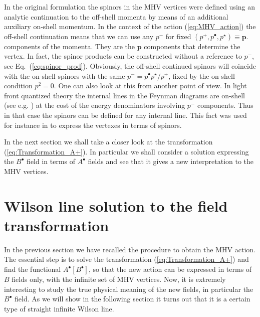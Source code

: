 \documentclass[english,american]{article}
\begin{document}
In the original formulation \citep{Cachazo2004} the spinors in the
MHV vertices were defined using an analytic continuation to the off-shell
momenta by means of  an additional auxiliary on-shell momentum. In the context
of the action (\ref{eq:MHV_action}) the off-shell continuation means
that we can use any $p^{-}$ for fixed  $\left(p^{+},p^{\bullet},p^{\star}\right)\equiv\mathbf{p}$.
components of the momenta. They are the $\mathbf{p}$ components that
determine the vertex. In fact, the spinor products can be constructed
without a reference to $p^{-}$, see Eq.~(\ref{eq:spinor_prod}). Obviously,
the off-shell continued spinors will coincide with the on-shell spinors
with the same $p^{-}=p^{\bullet}p^{\star}/p^{+}$,
fixed by the on-shell condition $p^{2}=0$. One can also look at this
from another point of view. In light front quantized theory the internal
lines in the Feynman diagrams are on-shell (see e.g. \citep{Cruz-Santiago2015a})
at the cost of the energy denominators involving $p^{-}$ components.
Thus in that case the spinors can be defined for any internal line.
This fact was used for instance in \citep{Motyka2009} to express
the vertexes in terms of spinors.

In the next section we shall take a closer look at the transformation
(\ref{eq:Transformation_A+}). In particular we shall consider a solution
expressing the $B^{\bullet}$ field in terms of $A^{\bullet}$ fields
and see that it gives a new interpretation to the MHV vertices.

\section{Wilson line solution to the field transformation}

\label{sec:WilsonLineSolution}

In the previous section we have recalled the procedure to obtain the
MHV action. The essential step is to solve the transformation (\ref{eq:Transformation_A+})
and find the functional $A^{\bullet}\left[B^{\bullet}\right]$, so
that the new action can be expressed in terms of $B$ fields only, with the infinite set of MHV vertices.
Now, it is extremely interesting to study the true physical meaning
of the new fields, in particular the $B^{\bullet}$ field. As we will
show in the following section it turns out that it is a certain type
of straight infinite Wilson line.
\end{document}
